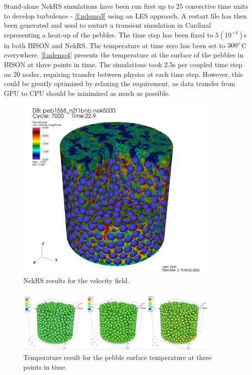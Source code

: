 Stand-alone NekRS simulations have been run first up to 25 convective time units to develop turbulence - \autoref{f:ndemo3} using an LES approach.
A restart file has then been generated and used to restart a transient simulation in Cardinal representing a heat-up of the pebbles.
The time step has been fixed to $5(10^{-4})$s in both BISON and NekRS.
The temperature at time zero has been set to $300\degree$C everywhere.
\autoref{f:ndemo4} presents the temperature at the surface of the pebbles in BISON at three points in time.
The simulations took 2.5s per coupled time step on 20 nodes, requiring transfer between physics at each time step.
However, this could be greatly optimized by relaxing the requirement, as data transfer from GPU to CPU should be minimized as much as possible.

\begin{figure}[htb!]
\centering
\includegraphics[clip=true,width=0.9\textwidth]{Figures/ndemo_r3}
\caption{NekRS results for the velocity field.}
\label{f:ndemo3}
\end{figure}


\begin{figure}[htb!]
\centering
\includegraphics[clip=true,width=0.9\textwidth]{Figures/ndemo_r4}
\caption{Temperature result for the pebble surface temperature at three points in time.}
\label{f:ndemo4}
\end{figure}


